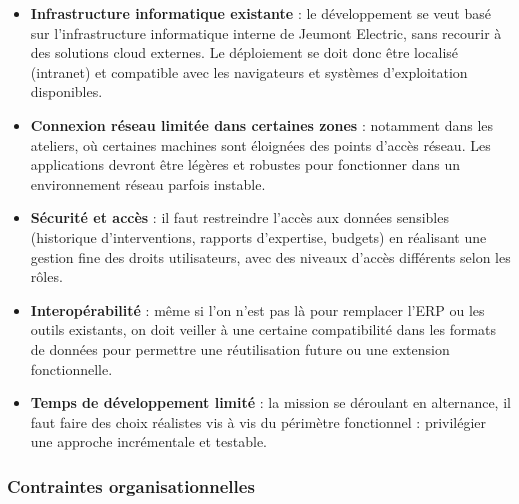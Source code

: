 \documentclass[11pt,a4paper]{article}
\begin{document}
\begin{itemize}
    \item \textbf{Infrastructure informatique existante} : le développement se veut basé sur l’infrastructure informatique interne de Jeumont Electric, sans recourir à des solutions cloud externes. Le déploiement se doit donc être localisé (intranet) et compatible avec les navigateurs et systèmes d’exploitation disponibles.

    \item \textbf{Connexion réseau limitée dans certaines zones} :  notamment dans les ateliers, où certaines machines sont éloignées des points d’accès réseau. Les applications devront être légères et robustes pour fonctionner dans un environnement réseau parfois instable.

    \item \textbf{Sécurité et accès} : il faut restreindre l’accès aux données sensibles (historique d’interventions, rapports d’expertise, budgets) en réalisant une gestion fine des droits utilisateurs, avec des niveaux d’accès différents selon les rôles.
    
    \item \textbf{Interopérabilité} : même si l’on n’est pas là pour remplacer l’ERP ou les outils existants, on doit veiller à une certaine compatibilité dans les formats de données pour permettre une réutilisation future ou une extension fonctionnelle.

    \item \textbf{Temps de développement limité} : la mission se déroulant en alternance, il faut faire des choix réalistes vis à vis du périmètre fonctionnel : privilégier une approche incrémentale et testable.
\end{itemize}

\newpage
\subsubsection{Contraintes organisationnelles}
\end{document}
